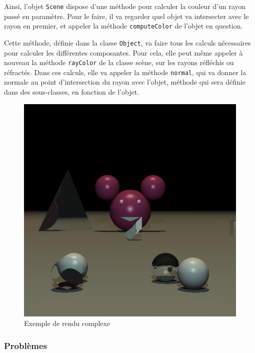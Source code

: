 \documentclass[a4paper]{article}
\begin{document}
    Ainsi, l'objet \verb+Scene+ dispose d'une méthode pour calculer la couleur
    d'un rayon passé en paramètre.
    Pour le faire, il va regarder quel objet va intersecter avec le rayon en
    premier, et appeler la méthode \verb+computeColor+ de l'objet en question.

    Cette méthode, définie dans la classe \verb+Object+, va faire tous les
    calculs nécessaires pour calculer les différentes composantes. Pour cela,
    elle peut même appeler à nouveau la méthode \verb+rayColor+ de la classe
    scène, sur les rayons réfléchis ou réfractés.
    Dans ces calculs, elle va appeler la méthode \verb+normal+, qui va donner
    la normale au point d'intersection du rayon avec l'objet, méthode qui sera
    définie dans des sous-classes, en fonction de l'objet.

    \begin{figure}[p]
      \includegraphics[width=\textwidth]{livrables/tests/raytracer/complet.png}
      \caption{Exemple de rendu complexe}
    \end{figure}

    \subsubsection{Problèmes}
\end{document}
